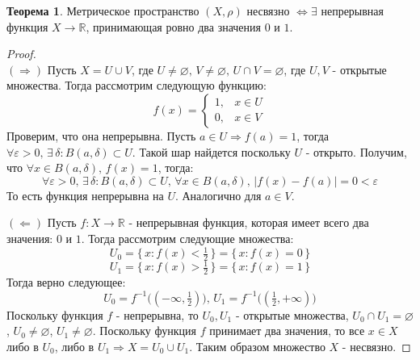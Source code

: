 \documentclass[12pt]{article}
\newcommand{\MR}{\mathbb{R}}
\newcommand{\VN}{\varnothing}
\newcommand{\VE}{\varepsilon}
\theoremstyle{definition}
\newtheorem{theorem}{Теорема}
\begin{document}
\begin{theorem}
	Метрическое пространство $(X,\rho)$ несвязно $\Leftrightarrow \exists$ непрерывная функция $X \to \MR$, принимающая ровно два значения $0$ и $1$. 
\end{theorem}
\begin{proof}\hfill\\
	$(\Rightarrow)$ Пусть $X = U \cup V$, где $U \neq \VN,\, V \neq \VN, \, U \cap V = \VN$, где $U,V$ - открытые множества. Тогда рассмотрим следующую функцию:
	$$
		f(x) = \begin{cases}
			1, & x \in U \\
			0, & x \in V
		\end{cases}
	$$ 
	Проверим, что она непрерывна. Пусть $a \in U \Rightarrow f(a) = 1$, тогда $\forall \VE > 0, \, \exists \, \delta \colon B(a,\delta) \subset U$. Такой шар найдется поскольку $U$ - открыто. Получим, что $\forall x \in B(a,\delta),\, f(x) = 1$, тогда:
	$$
		\forall \VE > 0, \, \exists \, \delta \colon B(a,\delta) \subset U, \, \forall x \in B(a,\delta),\, |f(x) - f(a)| = 0 < \VE
	$$
	То есть функция непрерывна на $U$. Аналогично для $a \in V$.
	
	$(\Leftarrow)$ Пусть $f \colon X \to \MR$ - непрерывная функция, которая имеет всего два значения: $0$ и $1$. Тогда рассмотрим следующие множества:
	$$
		U_0 = \{\,x \colon f(x) < \tfrac{1}{2} \,\} = \{\,x \colon f(x) = 0 \,\}
	$$
	$$
		U_1 = \{\,x \colon f(x) > \tfrac{1}{2} \,\} = \{\,x \colon f(x) = 1 \,\}
	$$ 
	Тогда верно следующее:
	$$
		U_0 = f^{-1}\big((-\infty, \tfrac{1}{2})\big), \, U_1 = f^{-1}\big((\tfrac{1}{2},+\infty )\big)
	$$
	Поскольку функция $f$ - непрерывна, то $U_0, U_1$ - открытые множества, $U_0 \cap U_1 = \VN$, $U_0 \neq \VN$, $U_1 \neq \VN$. Поскольку функция $f$ принимает два значения, то все $x \in X$ либо в $U_0$, либо в $U_1 \Rightarrow X = U_0 \cup U_1$. Таким образом множество $X$ - несвязно.
\end{proof}
\end{document}

